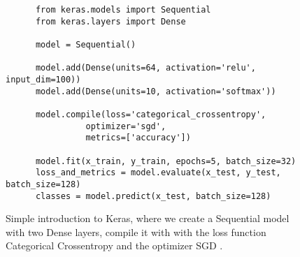 \begin{figure}
  
\begin{code}
  \begin{verbatim}
      from keras.models import Sequential
      from keras.layers import Dense
  
      model = Sequential()
  
      model.add(Dense(units=64, activation='relu', input_dim=100))
      model.add(Dense(units=10, activation='softmax'))
  
      model.compile(loss='categorical_crossentropy',
                optimizer='sgd',
                metrics=['accuracy'])
      
      model.fit(x_train, y_train, epochs=5, batch_size=32)
      loss_and_metrics = model.evaluate(x_test, y_test, batch_size=128)
      classes = model.predict(x_test, batch_size=128)
  \end{verbatim}

  \caption{Simple introduction to Keras, where we create a Sequential model with two Dense layers, compile it with with the loss function Categorical Crossentropy and the optimizer SGD \cite{keras_docs}.}
  \label{code:keras-guide}
\end{code}
\end{figure}